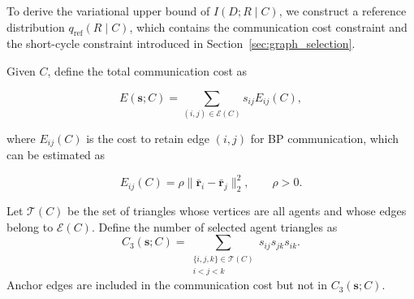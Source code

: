 To derive the variational upper bound of $I(D;R\mid C)$, we construct a reference distribution $q_{\mathrm{ref}}(R\mid C)$, which contains the communication cost constraint and the short-cycle constraint introduced in Section~\ref{sec:graph_selection}.

Given $C$, define the total communication cost as

\begin{equation}
    E(\mathbf s;C)
    =
    \sum_{(i, j)\in\mathcal E(C)}
    s_{ij}E_{ij}(C),
    \label{eq:graph_energy}
\end{equation}

where $E_{ij}(C)$ is the cost to retain edge $(i,j)$ for BP communication, which can be estimated as

\[
    E_{ij}(C)
    =
    \rho
    \|\bar{\mathbf r}_i-\bar{\mathbf r}_j\|_2^2,
    \qquad \rho>0.
\]

Let $\mathcal T(C)$ be the set of triangles whose vertices are all agents and whose edges belong to $\mathcal E(C)$. Define the number of selected agent triangles as
\begin{equation}
    C_3(\mathbf s;C)
    =
    \sum_{\substack{\{i,j,k\}\in\mathcal T(C)\\i<j<k}}
    s_{ij}s_{jk}s_{ik}.
    \label{eq:triangle_count}
\end{equation}
Anchor edges are included in the communication cost but not in $C_3(\mathbf s;C)$.


